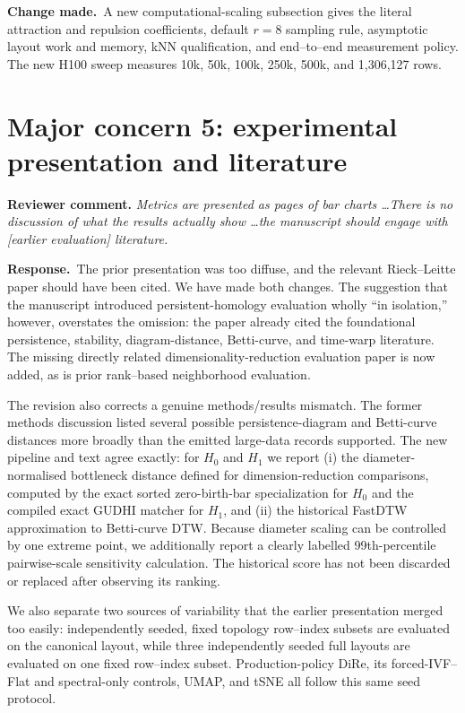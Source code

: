 \documentclass[11pt]{article}
\newcommand{\reviewcomment}[1]{%
  \medskip\noindent\textbf{Reviewer comment.} \emph{#1}\par\smallskip}
\newcommand{\response}{%
  \noindent\textcolor{responseblue}{\textbf{Response.}}\ }
\newcommand{\change}{%
  \noindent\textcolor{responseblue}{\textbf{Change made.}}\ }
\begin{document}
\change A new computational-scaling subsection gives the literal attraction
and repulsion coefficients, default $r=8$ sampling rule, asymptotic layout work
and memory, kNN qualification, and end--to--end measurement policy. The new
H100 sweep measures
10k, 50k, 100k, 250k, 500k, and 1,306,127 rows.

\section*{Major concern 5: experimental presentation and literature}

\reviewcomment{Metrics are presented as pages of bar charts \ldots There is no
discussion of what the results actually show \ldots the manuscript should
engage with [earlier evaluation] literature.}

\response The prior presentation was too diffuse, and the relevant Rieck--Leitte
paper should have been cited. We have made both changes. The suggestion that
the manuscript introduced persistent-homology evaluation wholly ``in
isolation,'' however, overstates the omission: the paper already cited the
foundational persistence, stability, diagram-distance, Betti-curve, and
time-warp literature. The missing directly related dimensionality-reduction
evaluation paper is now added, as is prior rank--based neighborhood evaluation.

The revision also corrects a genuine methods/results mismatch. The former
methods discussion listed several possible persistence-diagram and Betti-curve
distances more broadly than the emitted large-data records supported. The new
pipeline and text agree exactly: for $H_0$ and $H_1$ we report (i) the
diameter-normalised bottleneck distance defined for dimension-reduction
comparisons, computed by the exact sorted zero-birth-bar specialization for
$H_0$ and the compiled exact GUDHI matcher for $H_1$, and
(ii) the historical FastDTW approximation to Betti-curve DTW. Because diameter scaling can be
controlled by one extreme point, we additionally report a clearly labelled
99th-percentile pairwise-scale sensitivity calculation. The historical score
has not been discarded or replaced after observing its ranking.

We also separate two sources of variability that the earlier presentation
merged too easily: \TopologySubsetCount{} independently seeded, fixed topology
row--index subsets are evaluated on the canonical layout, while three
independently seeded full layouts are evaluated on one fixed row--index subset.
Production-policy DiRe, its forced-IVF--Flat and spectral-only controls, UMAP,
and tSNE all follow this same seed protocol.
\end{document}
